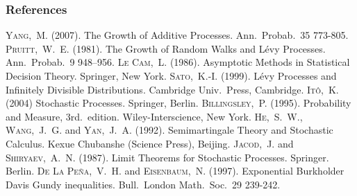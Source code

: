\documentclass[12pt]{beamer}
\begin{document}
\begin{frame}
	\frametitle{References}
	\tiny
	\begin{thebibliography}{9}
		 \textsc{Yang,~M.} (2007). The Growth of Additive Processes. Ann.~Probab.~35 773-805.
		 \textsc{Pruitt,~W.~E.} (1981). The Growth of Random Walks and L\'evy Processes. Ann.~Probab.~9 948--956.
		 \textsc{Le Cam,~L.} (1986). Asymptotic Methods in Statistical Decision Theory. Springer, New York.
		 \textsc{Sato,~K.-I.} (1999). L\'evy Processes and Infinitely Divisible Distributions. Cambridge Univ.~Press, Cambridge.
		 \textsc{It\^o,~K.} (2004) Stochastic Processes. Springer, Berlin.
		 \textsc{Billingsley,~P.} (1995). Probability and Measure, 3rd.~edition. Wiley-Interscience, New York.
		 \textsc{He,~S.~W.}, \textsc{Wang,~J.~G.} and \textsc{Yan,~J.~A.} (1992). Semimartingale Theory and Stochastic Calculus. Kexue Chubanshe (Science Press), Beijing.
		 \textsc{Jacod,~J.} and \textsc{Shiryaev,~A.~N.} (1987). Limit Theorems for Stochastic Processes. Springer. Berlin.
		 \textsc{De La Pe\~na,~V.~H.} and \textsc{Eisenbaum,~N.} (1997). Exponential Burkholder Davis Gundy inequalities. Bull.~London Math.~Soc.~29 239-242.
	\end{thebibliography}
\end{frame}
\end{document}
